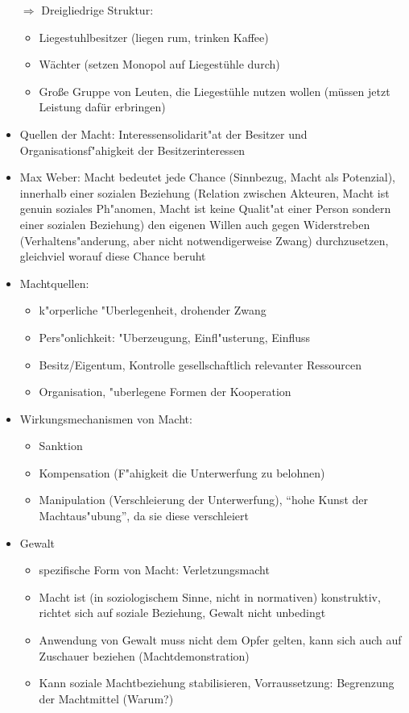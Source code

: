 \begin{itemize}
		$\Rightarrow$ Dreigliedrige Struktur:
		\begin{itemize}
			\item Liegestuhlbesitzer (liegen rum, trinken Kaffee)
			\item Wächter (setzen Monopol auf Liegestühle durch)
			\item Große Gruppe von Leuten, die Liegestühle nutzen wollen (müssen jetzt Leistung dafür erbringen)
		\end{itemize}
	\item
		Quellen der Macht: Interessensolidarit"at der Besitzer und Organisationsf"ahigkeit der Besitzerinteressen
	\item {}
		Max Weber: Macht bedeutet jede Chance (Sinnbezug, Macht als Potenzial), innerhalb einer sozialen Beziehung (Relation zwischen Akteuren, Macht ist genuin soziales Ph"anomen, Macht ist keine Qualit"at einer Person sondern einer sozialen Beziehung) den eigenen Willen auch gegen Widerstreben (Verhaltens"anderung, aber nicht notwendigerweise Zwang) durchzusetzen, gleichviel worauf diese Chance beruht
	\item
		Machtquellen:
		\begin{itemize}
			\item  k"orperliche "Uberlegenheit, drohender Zwang
			\item
				Pers"onlichkeit: "Uberzeugung, Einfl"usterung, Einfluss
			\item
				Besitz/Eigentum, Kontrolle gesellschaftlich relevanter Ressourcen
			\item
				Organisation, "uberlegene Formen der Kooperation
		\end{itemize}

	\item
		Wirkungsmechanismen von Macht:
		\begin{itemize}
			\item
				Sanktion
			\item
				Kompensation (F"ahigkeit die Unterwerfung zu belohnen)
			\item
				Manipulation (Verschleierung der Unterwerfung), \enquote{hohe Kunst der Macht\-aus\-"ub\-ung}, da sie diese verschleiert
		\end{itemize}

	\item
		Gewalt
		\begin{itemize}
			\item
				spezifische Form von Macht: Verletzungsmacht
			\item
				Macht ist (in soziologischem Sinne, nicht in normativen) konstruktiv, richtet sich auf soziale Beziehung, Gewalt nicht unbedingt
			\item
				Anwendung von Gewalt muss nicht dem Opfer gelten, kann sich auch auf Zuschauer beziehen (Machtdemonstration)
			\item
				Kann soziale Machtbeziehung stabilisieren, Vorraussetzung: Begrenzung der Machtmittel (Warum?)
		\end{itemize}


\end{itemize}
